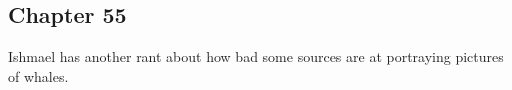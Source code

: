 \subsection{Chapter 55}

Ishmael has another rant about how bad some sources are at portraying pictures
of whales.

